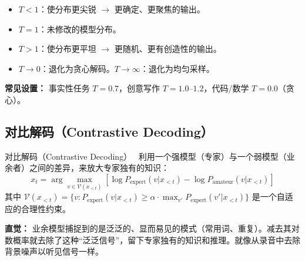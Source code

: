 \begin{itemize}
  \item $T < 1$：使分布更尖锐 $\to$ 更确定、更聚焦的输出。
  \item $T = 1$：未修改的模型分布。
  \item $T > 1$：使分布更平坦 $\to$ 更随机、更有创造性的输出。
  \item $T \to 0$：退化为贪心解码。$T \to \infty$：退化为均匀采样。
\end{itemize}

\textbf{常见设置：} 事实性任务 $T=0.7$，创意写作 $T=1.0$--$1.2$，代码/数学 $T=0.0$（贪心）。

\subsection{对比解码（Contrastive Decoding）}
\label{contrastive-decoding}

对比解码（Contrastive Decoding）~\cite{li2023contrastive} 利用一个强模型（专家）与一个弱模型（业余者）之间的差异，来放大专家独有的知识：
\[
x_t = \arg\max_{v \in \mathcal{V}(x_{<t})} \left[ \log P_{\text{expert}}(v | x_{<t}) - \log P_{\text{amateur}}(v | x_{<t}) \right]
\]
其中 $\mathcal{V}(x_{<t}) = \{v : P_{\text{expert}}(v | x_{<t}) \geq \alpha \cdot \max_{v'} P_{\text{expert}}(v' | x_{<t})\}$ 是一个自适应的合理性约束。

\textbf{直觉：} 业余模型捕捉到的是泛泛的、显而易见的模式（常用词、重复）。减去其对数概率就去除了这种“泛泛信号”，留下专家独有的知识和推理。就像从录音中去除背景噪声以听见信号一样。

